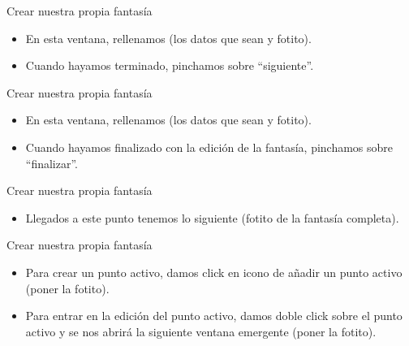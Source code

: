 \documentclass[aspectratio=169]{beamer}
\begin{document}
\begin{frame}{Crear nuestra propia fantasía}
\begin{itemize}
	\item En esta ventana, rellenamos (los datos que sean y fotito).
	\item Cuando hayamos terminado, pinchamos sobre ``siguiente''.
\end{itemize}
\end{frame}

\begin{frame}{Crear nuestra propia fantasía}
\begin{itemize}
	\item En esta ventana, rellenamos (los datos que sean y fotito).
	\item Cuando hayamos finalizado con la edición de la fantasía, pinchamos sobre ``finalizar''.
\end{itemize}
\end{frame}

\begin{frame}{Crear nuestra propia fantasía}
\begin{itemize}
	\item Llegados a este punto tenemos lo siguiente (fotito de la fantasía completa).
\end{itemize}
\end{frame}

\begin{frame}{Crear nuestra propia fantasía}
\begin{itemize}
	\item Para crear un punto activo, damos click en icono de añadir un punto activo (poner la fotito).
	\item Para entrar en la edición del punto activo, damos doble click sobre el punto activo y se nos abrirá la siguiente ventana emergente (poner la fotito).
\end{itemize}
\end{frame}
\end{document}

